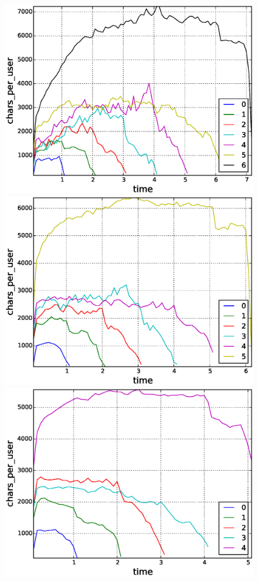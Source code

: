 \begin{figure}[!tb]
\centering
\includegraphics[scale=0.2]{./images/avr_comment_length_user_for_surviving_year_for_2008.eps}
\includegraphics[scale=0.2]{./images/avr_comment_length_user_for_surviving_year_for_2009.eps}
\includegraphics[scale=0.2]{./images/avr_comment_length_user_for_surviving_year_for_2010.eps}

\end{figure}
